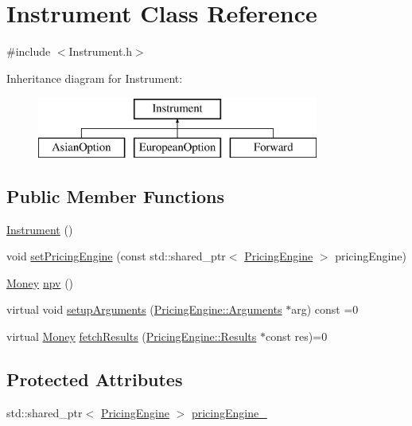 \hypertarget{class_instrument}{}\section{Instrument Class Reference}
\label{class_instrument}


{\ttfamily \#include $<$Instrument.\+h$>$}

Inheritance diagram for Instrument\+:\begin{figure}[H]
\begin{center}
\leavevmode
\includegraphics[height=2.000000cm]{class_instrument}
\end{center}
\end{figure}
\subsection*{Public Member Functions}
\begin{DoxyCompactItemize}
\item 
\hyperlink{class_instrument_a1a297b2cbe1e239c8ede2e90185e2880}{Instrument} ()
\item 
void \hyperlink{class_instrument_a47bdaa9390ab5e0616e8499a507c50cd}{set\+Pricing\+Engine} (const std\+::shared\+\_\+ptr$<$ \hyperlink{class_pricing_engine}{Pricing\+Engine} $>$ pricing\+Engine)
\item 
\hyperlink{_name_def_8h_a5a9d48c16a694e9a2d9f1eca730dc8c5}{Money} \hyperlink{class_instrument_aa750f2ae95a21d65a073da3171e8d084}{npv} ()
\item 
virtual void \hyperlink{class_instrument_ac0f78fd32a360abde0c31b5bc01c7e67}{setup\+Arguments} (\hyperlink{class_pricing_engine_1_1_arguments}{Pricing\+Engine\+::\+Arguments} $\ast$arg) const =0
\item 
virtual \hyperlink{_name_def_8h_a5a9d48c16a694e9a2d9f1eca730dc8c5}{Money} \hyperlink{class_instrument_a381f093402f789ad7c0ffecd233167dc}{fetch\+Results} (\hyperlink{class_pricing_engine_1_1_results}{Pricing\+Engine\+::\+Results} $\ast$const res)=0
\end{DoxyCompactItemize}
\subsection*{Protected Attributes}
\begin{DoxyCompactItemize}
\item 
std\+::shared\+\_\+ptr$<$ \hyperlink{class_pricing_engine}{Pricing\+Engine} $>$ \hyperlink{class_instrument_a6fdd5548ccc944536ff73913d98bf598}{pricing\+Engine\+\_\+}
\end{DoxyCompactItemize}


